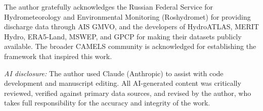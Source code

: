 \documentclass[essd, manuscript]{copernicus}
\begin{document}
\begin{acknowledgements}
The author gratefully acknowledges the Russian Federal Service for Hydrometeorology
and Environmental Monitoring (Roshydromet) for providing discharge data
through AIS GMVO, and the developers of HydroATLAS, MERIT Hydro,
ERA5-Land, MSWEP, and GPCP for making their datasets publicly
available. The broader CAMELS community is acknowledged for
establishing the framework that inspired this work.

\textit{AI disclosure:} The author used Claude (Anthropic) to assist with
code development and manuscript editing. All AI-generated content was
critically reviewed, verified against primary data sources, and revised
by the author, who takes full responsibility for the accuracy and
integrity of the work.
\end{acknowledgements}



\end{document}
